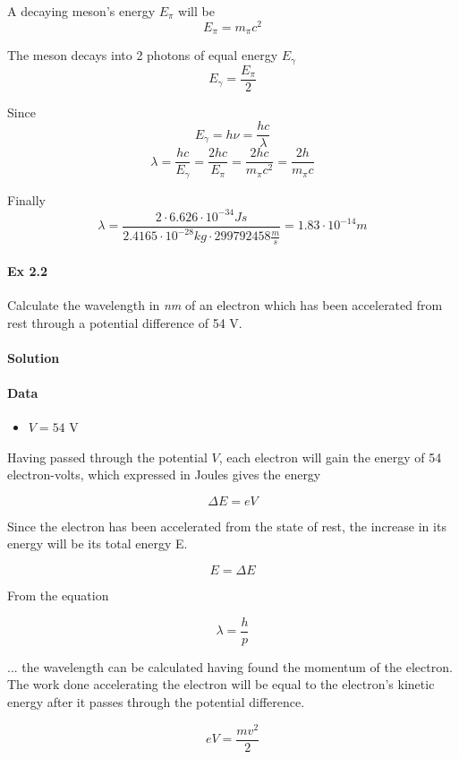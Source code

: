 \documentclass{article}
\begin{document}
A decaying meson's energy \textit{$E_\pi$} will be
\[ E_\pi = m_\pi c^2 \]

The meson decays into 2 photons of equal energy \textit{$E_\gamma$}
\[ E_\gamma = \frac{E_\pi}{2}\]

Since
\[ E_\gamma = h \nu  = \frac{h c}{\lambda} \]
\[ \lambda = 
\frac{h c}{E_\gamma} = 
\frac{2 h c}{E_\pi} = 
\frac{2 h c}{m_\pi c^2} = 
\frac{2 h}{m_\pi c} \]

Finally
\[ \lambda = \frac{2 \cdot 6.626 \cdot 10^{-34} J s}{2.4165 \cdot 10^{-28} kg \cdot 299792458 \frac{m}{s}} = 1.83 \cdot 10^{-14} m \]


\paragraph{Ex 2.2}
Calculate the wavelength in \textit{nm} of an electron which has been accelerated from rest through a potential difference of 54 V.
\paragraph{Solution}

\paragraph{Data}
\begin{itemize}
    \item $V = 54$ V 
\end{itemize}

Having passed through the potential $V$, each electron will gain the energy of 54 electron-volts, which expressed in Joules gives the energy

\[\Delta E = e V\]

Since the electron has been accelerated from the state of rest, the increase in its energy will be its total energy E.

\[E = \Delta E\]

From the equation

\[\lambda = \frac{h}{p}\]

... the wavelength can be calculated having found the momentum of the electron.\\

The work done accelerating the electron will be equal to the electron's kinetic energy after it passes through the potential difference.

\[e V = \frac{mv^2}{2}\]
\end{document}
